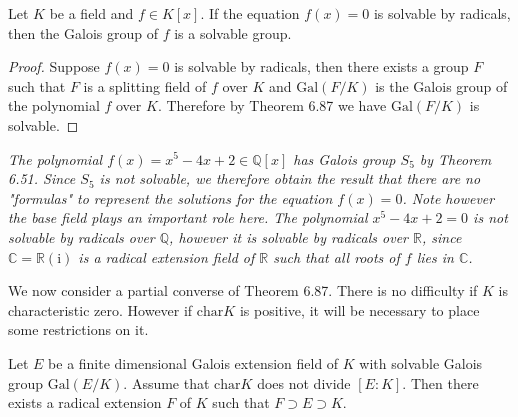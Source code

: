 \begin{corollary}
Let $K$ be a field and $f\in K[x]$. If the equation $f(x)=0$ is solvable by radicals, then the Galois group of $f$ is a solvable group.
\end{corollary}
\begin{proof}
Suppose $f(x)=0$ is solvable by radicals, then there exists a group $F$ such that $F$ is a splitting field of $f$ over $K$ and $\mathrm{Gal}(F/K)$ is the Galois group of the polynomial $f$ over $K$. Therefore by Theorem 6.87 we have $\mathrm{Gal}(F/K)$ is solvable.
\end{proof}
\begin{example}\em
The polynomial $f(x)=x^5-4x+2\in\mathbb{Q}[x]$ has Galois group $S_5$ by Theorem 6.51. Since $S_5$ is not solvable, we therefore obtain the result that there are no "formulas" to represent the solutions for the equation $f(x)=0$. Note however the base field plays an important role here. The polynomial $x^5-4x+2=0$ is not solvable by radicals over $\mathbb{Q}$, however it is solvable by radicals over $\mathbb{R}$, since $\mathbb{C}=\mathbb{R}(\mathrm{i})$ is a radical extension field of $\mathbb{R}$ such that all roots of $f$ lies in $\mathbb{C}$.
\end{example}
We now consider a partial converse of Theorem 6.87. There is no difficulty if $K$ is characteristic zero. However if $\mathrm{char}K$ is positive, it will be necessary to place some restrictions on it.
\begin{proposition}
Let $E$ be a finite dimensional Galois extension field of $K$ with solvable Galois group $\mathrm{Gal}(E/K)$. Assume that $\mathrm{char}K$ does not divide $[E:K]$. Then there exists a radical extension $F$ of $K$ such that $F\supset E\supset K$.
\end{proposition}
